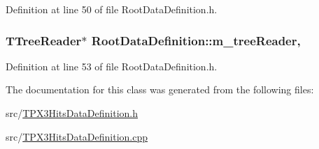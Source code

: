 Definition at line 50 of file Root\+Data\+Definition.\+h.

\hypertarget{classRootDataDefinition_a919827bdd245e61c0f54676d59cc7448}{
\subsubsection[{m\+\_\+tree\+Reader}]{\setlength{\rightskip}{0pt plus 5cm}T\+Tree\+Reader$\ast$ Root\+Data\+Definition\+::m\+\_\+tree\+Reader\hspace{0.3cm}{\ttfamily [protected]}, {\ttfamily [inherited]}}}\label{classRootDataDefinition_a919827bdd245e61c0f54676d59cc7448}


Definition at line 53 of file Root\+Data\+Definition.\+h.



The documentation for this class was generated from the following files\+:\begin{DoxyCompactItemize}
\item 
src/\hyperlink{TPX3HitsDataDefinition_8h}{T\+P\+X3\+Hits\+Data\+Definition.\+h}\item 
src/\hyperlink{TPX3HitsDataDefinition_8cpp}{T\+P\+X3\+Hits\+Data\+Definition.\+cpp}\end{DoxyCompactItemize}
